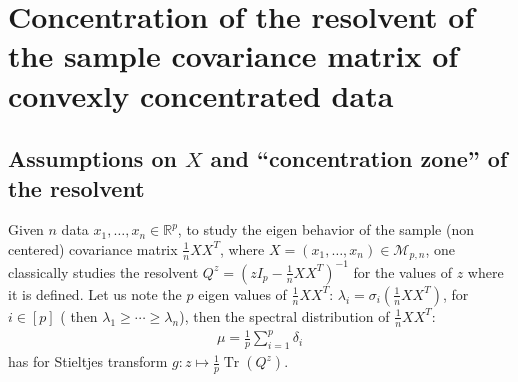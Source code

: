 \documentclass{ws-rmta}
\DeclareMathOperator{\tr}{Tr}
\begin{document}
\section{Concentration of the resolvent of the sample covariance matrix of convexly concentrated data}\label{sse:convex_concentration_resolvent}
\subsection{Assumptions on $X$ and ``concentration zone'' of the resolvent}
Given $n$ data $x_1,\ldots, x_n \in \mathbb R^p$, to study the eigen behavior of the sample (non centered) covariance matrix $\frac{1}{n}XX^T$, where $X = (x_1,\ldots, x_n) \in \mathcal{M}_{p,n}$, one classically studies the resolvent $Q^z = (zI_p - \frac{1}{n} XX^T)^{-1} $ for the values of $z$ where it is defined. Let us note the $p$ eigen values of $\frac{1}{n}XX^T$: $\lambda_i = \sigma_i(\frac{1}{n}XX^T)$, for $i \in [p]$ ( then $\lambda_1\geq \cdots \geq \lambda_n$), then the spectral distribution of $\frac{1}{n}XX^T$:
\begin{align*}
  \mu = \frac{1}{p} \sum_{i=1}^p \delta_i
\end{align*}
has for Stieltjes transform $g : z \mapsto \frac{1}{p} \tr (Q^z)$. 
\end{document}
